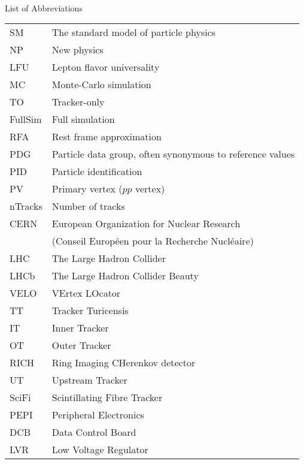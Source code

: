 \singlespacing \normalsize
\hbox{\ }

\vspace{.5in}

\begin{center}
\large{List of Abbreviations}
\end{center}

\vspace{3pt}

\begin{supertabular}{ll}
    SM      & The standard model of particle physics \\
    NP      & New physics \\
    LFU     & Lepton flavor universality \\
    MC      & Monte-Carlo simulation \\
    TO      & Tracker-only \\
    FullSim & Full simulation \\
    RFA     & Rest frame approximation \\
    PDG     & Particle data group, often synonymous to reference values \\
    PID     & Particle identification \\
    PV      & Primary vertex ($pp$ vertex) \\
    nTracks & Number of tracks \\
    CERN    & European Organization for Nuclear Research \\
            & (Conseil Européen pour la Recherche Nucléaire) \\
    LHC     & The Large Hadron Collider \\
    LHCb    & The Large Hadron Collider Beauty \\
    VELO    & VErtex LOcator \\
    TT      & Tracker Turicensis \\
    IT      & Inner Tracker \\
    OT      & Outer Tracker \\
    RICH    & Ring Imaging CHerenkov detector \\
    UT      & Upstream Tracker \\
    SciFi   & Scintillating Fibre Tracker \\
    PEPI    & Peripheral Electronics \\
    DCB     & Data Control Board \\
    LVR     & Low Voltage Regulator \\
\end{supertabular}
